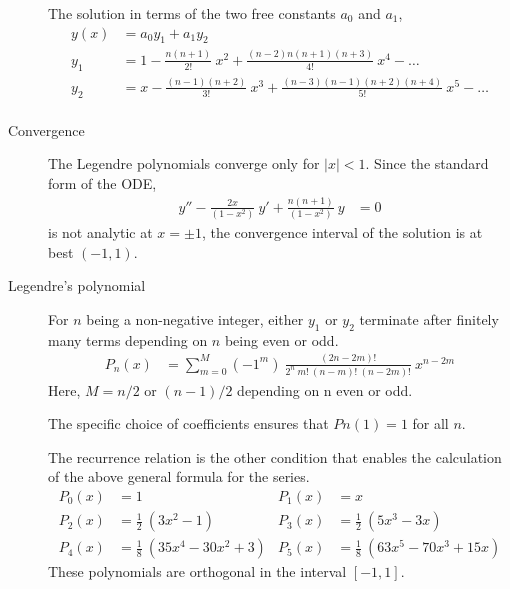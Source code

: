 \begin{description}
        The solution in terms of the two free constants $ a_0 $ and $ a_1 $,
        \begin{align}
            y(x) & = a_0y_1 + a_1 y_2                      \\
            y_1  & = 1 - \frac{n(n+1)}{2!}\ x^2
            + \frac{(n-2)n(n+1)(n+3)}{4!}\ x^4 - \dots     \\
            y_2  & = x - \frac{(n-1)(n+2)}{3!}\ x^3
            + \frac{(n-3)(n-1)(n+2)(n+4)}{5!}\ x^5 - \dots \\
        \end{align}
    \item[Convergence] The Legendre polynomials converge only for $ |x| < 1 $.
        Since the standard form of the ODE,
        \begin{align}
            y'' - \frac{2x}{(1-x^2)}\ y' + \frac{n(n+1)}{(1 - x^2)}\ y & = 0
        \end{align}
        is not analytic at $ x = \pm 1 $, the convergence interval of the solution is
        at best $ (-1, 1) $.
    \item[Legendre's polynomial] For $ n $ being a non-negative integer, either $ y_1 $
        or $ y_2 $ terminate after finitely many terms depending on $ n $ being even or odd.
        \begin{align}
            P_n(x) & = \sum_{m = 0}^{M} (-1^m)\ \frac{(2n - 2m)!}
            {2^n\ m!\ (n-m)!\ (n-2m)!}\ x^{n-2m}
        \end{align}
        Here, $ M = n/2 $ or $ (n-1)/2 $ depending on n even or odd. \par
        The specific choice of coefficients ensures that $ Pn(1) = 1 $ for all $ n $. \par
        The recurrence relation is the other condition that enables the calculation of the
        above general formula for the series.
        \begin{align}
            P_0(x) & = 1                                  &
            P_1(x) & = x                                    \\
            P_2(x) & = \frac{1}{2}\ (3x^2 - 1)            &
            P_3(x) & = \frac{1}{2}\ (5x^3 - 3x)             \\
            P_4(x) & = \frac{1}{8}\ (35x^4 - 30x^2 + 3)   &
            P_5(x) & = \frac{1}{8}\ (63x^5 - 70x^3 + 15x)
        \end{align}
        These polynomials are orthogonal in the interval $ [-1, 1] $.\
\end{description}


